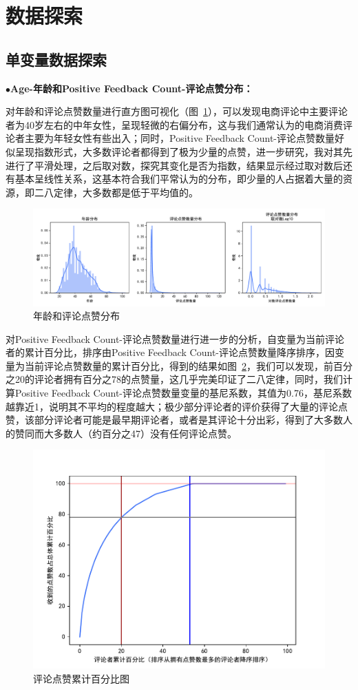 \documentclass[
  journal=medium,
  manuscript=article-type,
  year=2023,
  volume=37,
]{cup-journal}
\begin{document}
\section{数据探索} 

\subsection{单变量数据探索} 

$\bullet$\textbf{Age-年龄和Positive Feedback Count-评论点赞分布：}

对年龄和评论点赞数量进行直方图可视化（图~\ref{age_Feedback}），可以发现电商评论中主要评论者为40岁左右的中年女性，呈现轻微的右偏分布，这与我们通常认为的电商消费评论者主要为年轻女性有些出入；同时，Positive Feedback Count-评论点赞数量好似呈现指数形式，大多数评论者都得到了极为少量的点赞，进一步研究，我对其先进行了平滑处理，之后取对数，探究其变化是否为指数，结果显示经过取对数后还有基本呈线性关系，这基本符合我们平常认为的分布，即少量的人占据着大量的资源，即二八定律，大多数都是低于平均值的。

\begin{figure}[hbt!]
    \centering
    \includegraphics[width=1.0\linewidth]{age_positivefeedback.pdf}
    \caption{年龄和评论点赞分布}
    \label{age_Feedback}
\end{figure}

对Positive Feedback Count-评论点赞数量进行进一步的分析，自变量为当前评论者的累计百分比，排序由Positive Feedback Count-评论点赞数量降序排序，因变量为当前评论点赞数量的累计百分比，得到的结果如图~\ref{28}，我们可以发现，前百分之20的评论者拥有百分之78的点赞量，这几乎完美印证了二八定律，同时，我们计算Positive Feedback Count-评论点赞数量变量的基尼系数，其值为0.76，基尼系数越靠近1，说明其不平均的程度越大；极少部分评论者的评价获得了大量的评论点赞，该部分评论者可能是最早期评论者，或者是其评论十分出彩，得到了大多数人的赞同而大多数人（约百分之47）没有任何评论点赞。

\begin{figure}[hbt!]
    \centering
    \includegraphics[width=0.6\linewidth]{28.pdf}
    \caption{评论点赞累计百分比图}
    \label{28}
\end{figure}
\end{document}
